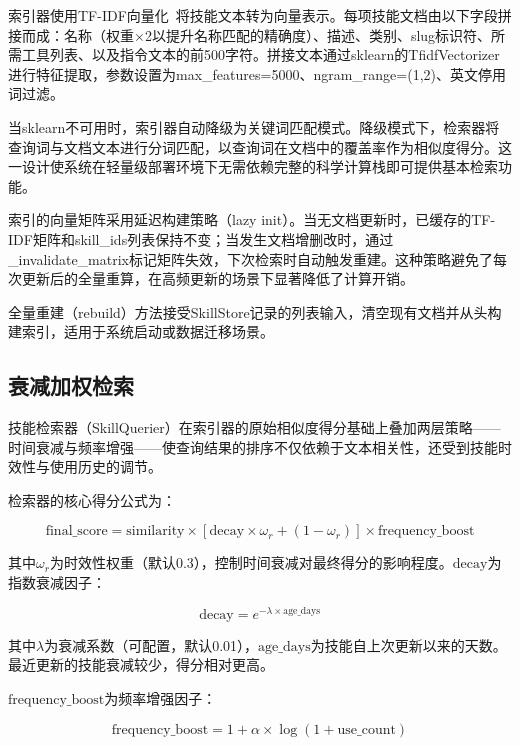 \documentclass[conference]{IEEEtran}
\begin{document}
索引器使用TF-IDF向量化~\cite{salton1975vector}将技能文本转为向量表示。每项技能文档由以下字段拼接而成：名称（权重×2以提升名称匹配的精确度）、描述、类别、slug标识符、所需工具列表、以及指令文本的前500字符。拼接文本通过sklearn的TfidfVectorizer进行特征提取，参数设置为max\_features=5000、ngram\_range=(1,2)、英文停用词过滤。

当sklearn不可用时，索引器自动降级为关键词匹配模式。降级模式下，检索器将查询词与文档文本进行分词匹配，以查询词在文档中的覆盖率作为相似度得分。这一设计使系统在轻量级部署环境下无需依赖完整的科学计算栈即可提供基本检索功能。

索引的向量矩阵采用延迟构建策略（lazy init）。当无文档更新时，已缓存的TF-IDF矩阵和skill\_ids列表保持不变；当发生文档增删改时，通过\_invalidate\_matrix标记矩阵失效，下次检索时自动触发重建。这种策略避免了每次更新后的全量重算，在高频更新的场景下显著降低了计算开销。

全量重建（rebuild）方法接受SkillStore记录的列表输入，清空现有文档并从头构建索引，适用于系统启动或数据迁移场景。

\subsection{衰减加权检索}

技能检索器（SkillQuerier）在索引器的原始相似度得分基础上叠加两层策略——时间衰减与频率增强——使查询结果的排序不仅依赖于文本相关性，还受到技能时效性与使用历史的调节。

检索器的核心得分公式为：

\begin{equation}
\mathrm{final\_score} = \mathrm{similarity} \times [\mathrm{decay} \times \omega_r + (1 - \omega_r)] \times \mathrm{frequency\_boost}
\label{eq:final_score}
\end{equation}

其中$\omega_r$为时效性权重（默认0.3），控制时间衰减对最终得分的影响程度。$\mathrm{decay}$为指数衰减因子：

\begin{equation}
\mathrm{decay} = e^{-\lambda \times \mathrm{age\_days}}
\label{eq:decay}
\end{equation}

其中$\lambda$为衰减系数（可配置，默认0.01），$\mathrm{age\_days}$为技能自上次更新以来的天数。最近更新的技能衰减较少，得分相对更高。

$\mathrm{frequency\_boost}$为频率增强因子：

\begin{equation}
\mathrm{frequency\_boost} = 1 + \alpha \times \log(1 + \mathrm{use\_count})
\label{eq:freq_boost}
\end{equation}
\end{document}
